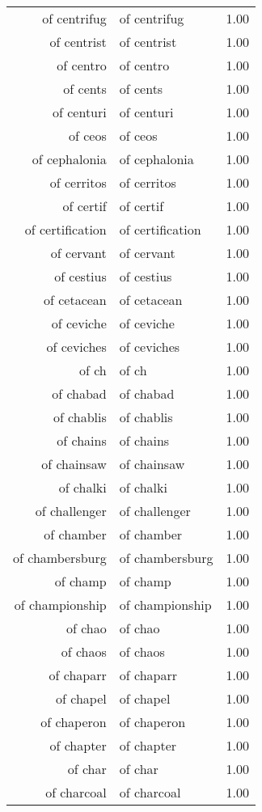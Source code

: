 \begin{table}[ht]
\begin{tabular}{rlr}
  of centrifug & of centrifug & 1.00 \\ 
  of centrist & of centrist & 1.00 \\ 
  of centro & of centro & 1.00 \\ 
  of cents & of cents & 1.00 \\ 
  of centuri & of centuri & 1.00 \\ 
  of ceos & of ceos & 1.00 \\ 
  of cephalonia & of cephalonia & 1.00 \\ 
  of cerritos & of cerritos & 1.00 \\ 
  of certif & of certif & 1.00 \\ 
  of certification & of certification & 1.00 \\ 
  of cervant & of cervant & 1.00 \\ 
  of cestius & of cestius & 1.00 \\ 
  of cetacean & of cetacean & 1.00 \\ 
  of ceviche & of ceviche & 1.00 \\ 
  of ceviches & of ceviches & 1.00 \\ 
  of ch & of ch & 1.00 \\ 
  of chabad & of chabad & 1.00 \\ 
  of chablis & of chablis & 1.00 \\ 
  of chains & of chains & 1.00 \\ 
  of chainsaw & of chainsaw & 1.00 \\ 
  of chalki & of chalki & 1.00 \\ 
  of challenger & of challenger & 1.00 \\ 
  of chamber & of chamber & 1.00 \\ 
  of chambersburg & of chambersburg & 1.00 \\ 
  of champ & of champ & 1.00 \\ 
  of championship & of championship & 1.00 \\ 
  of chao & of chao & 1.00 \\ 
  of chaos & of chaos & 1.00 \\ 
  of chaparr & of chaparr & 1.00 \\ 
  of chapel & of chapel & 1.00 \\ 
  of chaperon & of chaperon & 1.00 \\ 
  of chapter & of chapter & 1.00 \\ 
  of char & of char & 1.00 \\ 
  of charcoal & of charcoal & 1.00 \\ 

\end{tabular}
\end{table}
